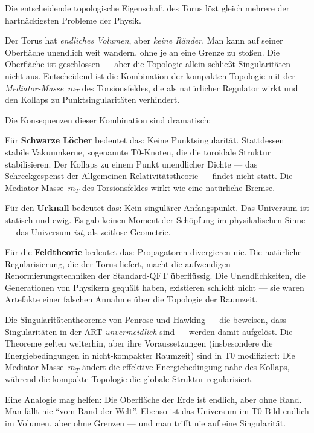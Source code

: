 Die entscheidende topologische Eigenschaft des Torus löst gleich mehrere der hartnäckigsten Probleme der Physik.

Der Torus hat \emph{endliches Volumen}, aber \emph{keine Ränder}. Man kann auf seiner Oberfläche unendlich weit wandern, ohne je an eine Grenze zu stoßen. Die Oberfläche ist geschlossen --- aber die Topologie allein schließt Singularitäten nicht aus. Entscheidend ist die Kombination der kompakten Topologie mit der \emph{Mediator-Masse~$m_T$} des Torsionsfeldes, die als natürlicher Regulator wirkt und den Kollaps zu Punktsingularitäten verhindert.

Die Konsequenzen dieser Kombination sind dramatisch:

Für \textbf{Schwarze Löcher} bedeutet das: Keine Punktsingularität. Stattdessen stabile Vakuumkerne, sogenannte T0-Knoten, die die toroidale Struktur stabilisieren. Der Kollaps zu einem Punkt unendlicher Dichte --- das Schreckgespenst der Allgemeinen Relativitätstheorie --- findet nicht statt. Die Mediator-Masse~$m_T$ des Torsionsfeldes wirkt wie eine natürliche Bremse.

Für den \textbf{Urknall} bedeutet das: Kein singulärer Anfangspunkt. Das Universum ist statisch und ewig. Es gab keinen Moment der Schöpfung im physikalischen Sinne --- das Universum \emph{ist}, als zeitlose Geometrie.

Für die \textbf{Feldtheorie} bedeutet das: Propagatoren divergieren nie. Die natürliche Regularisierung, die der Torus liefert, macht die aufwendigen Renormierungstechniken der Standard-QFT überflüssig. Die Unendlichkeiten, die Generationen von Physikern gequält haben, existieren schlicht nicht --- sie waren Artefakte einer falschen Annahme über die Topologie der Raumzeit.

Die Singularitätentheoreme von Penrose und Hawking --- die beweisen, dass Singularitäten in der ART \emph{unvermeidlich} sind --- werden damit aufgelöst. Die Theoreme gelten weiterhin, aber ihre Voraussetzungen (insbesondere die Energiebedingungen in nicht-kompakter Raumzeit) sind in T0 modifiziert: Die Mediator-Masse~$m_T$ ändert die effektive Energiebedingung nahe des Kollaps, während die kompakte Topologie die globale Struktur regularisiert.

Eine Analogie mag helfen: Die Oberfläche der Erde ist endlich, aber ohne Rand. Man fällt nie \enquote{vom Rand der Welt}. Ebenso ist das Universum im T0-Bild endlich im Volumen, aber ohne Grenzen --- und man trifft nie auf eine Singularität.

